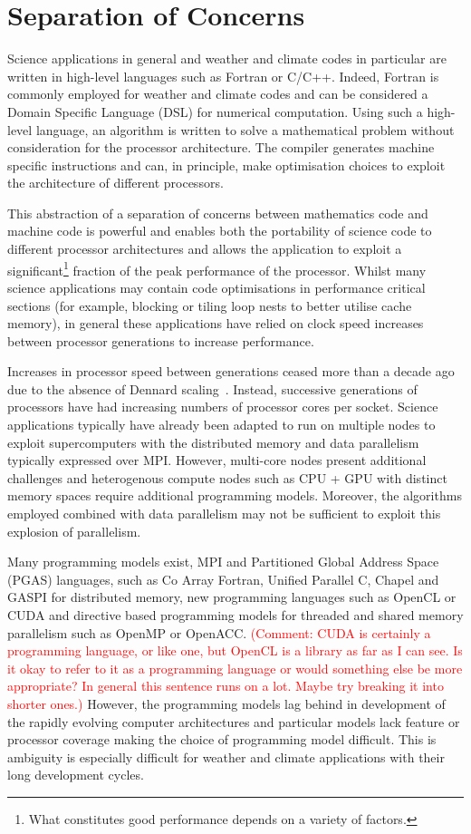 \documentclass[times]{elsarticle}
\begin{document}
\section{\label{sec:SoC}Separation of Concerns}
Science applications in general and weather and climate codes in
particular are written in high-level languages such as Fortran or
C/C++. Indeed, Fortran is commonly employed for weather and climate
codes and can be considered a Domain Specific Language (DSL) for
numerical computation. Using such a high-level language, an
algorithm is written to solve a mathematical problem without
consideration for the processor architecture. The compiler generates
machine specific instructions and can, in principle, make optimisation
choices to exploit the architecture of different processors.

This abstraction of a separation of concerns between mathematics code
and machine code is powerful and enables both the portability of
science code to different processor architectures and allows the
application to exploit a significant\footnote{What constitutes good
performance depends on a variety of factors.} fraction of the peak
performance of the processor. Whilst many science applications may
contain code optimisations in performance critical sections (for
example, blocking or tiling loop nests to better utilise cache memory),
in general these applications have relied on clock
speed increases between processor generations to increase performance.

Increases in processor speed between generations ceased more than a decade
ago due to the absence of Dennard scaling~\cite{dennard}. Instead,
successive generations of processors have had increasing numbers of processor cores per
socket. Science applications typically have already been adapted to run on multiple
nodes to exploit supercomputers with the distributed memory and data parallelism
typically expressed over MPI. However, multi-core nodes present
additional challenges and heterogenous compute nodes such as
CPU + GPU with distinct memory spaces require additional programming
models. Moreover, the algorithms employed combined with data
parallelism may not be sufficient to exploit this explosion of parallelism.

Many programming models exist, MPI and Partitioned Global Address
Space (PGAS) languages, such as Co Array Fortran, Unified Parallel C,
Chapel and GASPI for distributed memory, new programming languages such
as OpenCL or CUDA and directive based programming models for threaded
and shared memory parallelism such as OpenMP or OpenACC.
\textcolor{red}{(Comment: CUDA is certainly a programming language, or like one, 
but OpenCL is a library as far as I can see. 
Is it okay to refer to it as a programming language or 
would something else be more appropriate?
In general this sentence runs on a lot. 
Maybe try breaking it into shorter ones.)} 
However,
the programming models lag behind in development of the rapidly evolving computer
architectures and particular models lack feature or processor coverage
making the choice of programming model difficult. This is ambiguity is
especially difficult for weather and climate applications with their long development
cycles. 
\end{document}
